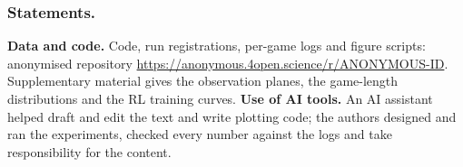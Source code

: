 \documentclass[runningheads]{llncs}
\begin{document}
\subsubsection*{Statements.}
\noindent\textbf{Data and code.} Code, run registrations, per-game logs and figure scripts: anonymised repository \url{https://anonymous.4open.science/r/ANONYMOUS-ID}. Supplementary material gives the observation planes, the game-length distributions and the RL training curves.
\noindent\textbf{Use of AI tools.} An AI assistant helped draft and edit the text and write plotting code; the authors designed and ran the experiments, checked every number against the logs and take responsibility for the content.



\end{document}
